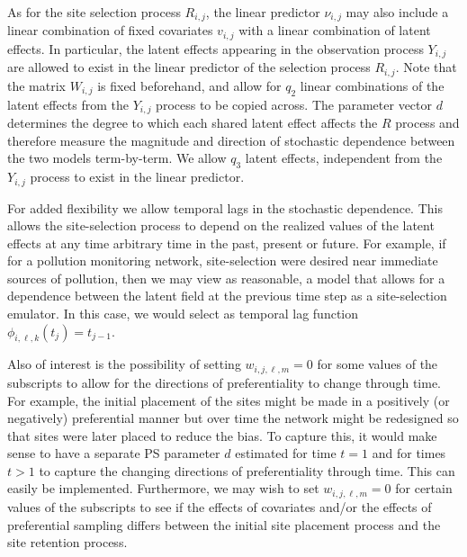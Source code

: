 As for the site selection process $R_{i, j}$, the linear predictor $\nu_{i, j}$ may also include 
a linear combination of fixed covariates $v_{i, j}$ with a linear combination of latent effects.
In particular, the latent effects appearing in the observation process $Y_{i, j}$ are allowed to exist
in the linear predictor of the selection process $R_{i, j}$. Note that the matrix $W_{i, j}$ is fixed
beforehand, and allow for $q_2$ linear combinations of the latent effects from the $Y_{i, j}$ 
process to be copied across. The parameter vector $d$ determines the degree to which each shared
latent effect affects the $R$ process and therefore measure the magnitude and direction of stochastic
dependence between the two models term-by-term. We allow $q_3$ latent effects, independent 
from the $Y_{i, j}$ process to exist in the linear predictor.

For added flexibility we allow temporal lags in the stochastic dependence. This allows the 
site-selection process to depend on the realized values of the latent effects at any time arbitrary 
time in the past, present or future. For example, if for a pollution monitoring network, 
site-selection were desired near immediate sources of pollution, then we may view as reasonable, 
a model that allows for a dependence between the latent field at the previous time step 
as a site-selection emulator. In this case, we would select as temporal lag function 
$\phi_{i, \ell, k}(t_j) = t_{j-1}$. 

Also of interest is the possibility of setting $w_{i,j,\ell,m} = 0$ for some values of the subscripts
to allow for the directions of preferentiality to change through time. For example, 
the initial placement of the sites might be made in a positively (or negatively) preferential manner
but over time the network might be redesigned so that sites were later placed to reduce the bias. 
To capture this, it would make sense to have a separate PS parameter $d$ estimated for time $t = 1$
and for times $t > 1$ to capture the changing directions of preferentiality through time. 
This can easily be implemented. Furthermore, we may wish to set $w_{i,j,\ell,m} = 0$ for certain 
values of the subscripts to see if the effects of covariates and/or the effects of preferential sampling 
differs between the initial site placement process and the site retention process.